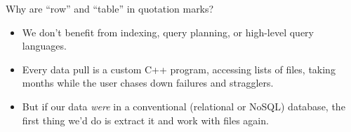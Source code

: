 \documentclass[aspectratio=169]{beamer}
\begin{document}
\begin{frame}{Why are ``row'' and ``table'' in quotation marks?}
\vspace{0.75 cm}

\vspace{0.5 cm}
\begin{itemize}\setlength{\itemsep}{0.5 cm}
\item<3-> We don't benefit from indexing, query planning, or high-level query languages.
\item<4-> Every data pull is a custom C++ program, accessing lists of files, taking months while the user chases down failures and stragglers.
\item<5-> But if our data {\it were} in a conventional (relational or NoSQL) database, the first thing we'd do is extract it and work with files again.
\end{itemize}
\begin{center}
\huge {}
\end{center}
\end{frame}
\end{document}
